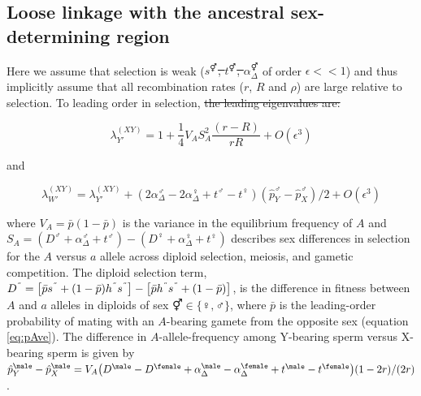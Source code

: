 \documentclass[10pt,letterpaper]{article}
\providecommand{\DIFadd}[1]{{\protect\color{blue}\uwave{#1}}} %
\providecommand{\DIFdel}[1]{{\protect\color{red}\sout{#1}}}                      %
\providecommand{\DIFaddbegin}{} %
\providecommand{\DIFaddend}{} %
\providecommand{\DIFdelbegin}{} %
\providecommand{\DIFdelend}{} %
\begin{document}
\subsection*{Loose linkage with the ancestral sex-determining region}

Here we assume that selection is weak (\DIFdelbegin \DIFdel{$s^\Hermaphrodite$, $t^\Hermaphrodite$, $\alpha_{\Delta}^\Hermaphrodite$ }\DIFdelend \DIFaddbegin \DIFadd{$s^\circ$, $t^\circ$, $\alpha_{\Delta}^\circ$ }\DIFaddend of order $\epsilon<<1$) and thus implicitly assume that all recombination rates ($r$, $R$ and $\rho$) are large relative to selection.
To leading order in selection,
\DIFdelbegin \DIFdel{the leading eigenvalues are:
}\DIFdelend 

\begin{equation}
\lambda_{Y'}^{(XY)} = 1 + \frac{1}{4}V_{A}S_{A}^2\frac{ \left( r-R \right) }{r R}+O\left(\epsilon^3 \right) 
\label{eq:lambda_neoY}
\end{equation}

\noindent 
and 

\begin{equation}
\lambda_{W'}^{(XY)} =\lambda_{Y'}^{(XY)}+\left(2\alpha_{\Delta}^\male-2\alpha_{\Delta}^\female+t^\male-t^\female \right) \left( \hat{p}^\male_Y-\hat{p}^\male_X \right)/2
+O\left(\epsilon^3 \right)
\label{eq:lambda_neoW}
\end{equation}

\noindent
where $V_{A}=\bar{p}(1-\bar{p})$ is the variance in the equilibrium frequency of $A$ and $S_{A}=(D^\male +\alpha_{\Delta}^\male+t^\male) - (D^\female+\alpha_{\Delta}^\female+t^\female)$ describes sex differences in selection for the $A$ versus $a$ allele across diploid selection, meiosis, and gametic competition.
The diploid selection term, \DIFdelbegin \DIFdel{$D^\Hermaphrodite=\big{[} \bar{p}s^\Hermaphrodite+(1-\bar{p})h^\Hermaphrodite s^\Hermaphrodite\big{]} -\big{[} \bar{p}h^\Hermaphrodite s^\Hermaphrodite+(1-\bar{p}) \big{]}$}\DIFdelend \DIFaddbegin \DIFadd{$D^\circ=\big{[} \bar{p}s^\circ+(1-\bar{p})h^\circ s^\circ\big{]} -\big{[} \bar{p}h^\circ s^\circ+(1-\bar{p}) \big{]}$}\DIFaddend , is the difference in fitness between $A$ and $a$ alleles in diploids of sex \DIFdelbegin \DIFdel{$\Hermaphrodite \in \{\female,\male\}$}\DIFdelend \DIFaddbegin \DIFadd{$\circ \in \{\female,\male\}$}\DIFaddend , where $\bar{p}$ is the leading-order probability of mating with an $A$-bearing gamete from the opposite sex (equation \ref{eq:pAve}). 
The difference in $A$-allele-frequency among Y-bearing sperm versus X-bearing sperm is given by $\hat{p}^\male_Y-\hat{p}^\male_X=V_{A}\big{(}D^\male - D^\female+\alpha_{\Delta}^\male-\alpha_{\Delta}^\female+t^\male-t^\female\big{)}(1-2r)/(2r)$. 
\end{document}
